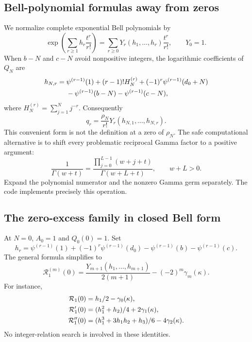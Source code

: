 \documentclass[11pt,letterpaper]{article}
\numberwithin{equation}{section}
\theoremstyle{definition}
\theoremstyle{remark}
\newcommand{\Rcal}{\mathcal R}
\begin{document}
\subsection{Bell-polynomial formulas away from zeros}

We normalize complete exponential Bell polynomials by
\begin{equation}
 \exp\left(\sum_{r\geq1}h_r\frac{t^r}{r!}\right)
       =\sum_{r\geq0}Y_r(h_1,\ldots,h_r)\frac{t^r}{r!},
 \qquad Y_0=1.
 \label{dr:eq:Bell}
\end{equation}
When $b-N$ and $c-N$ avoid nonpositive integers, the logarithmic
coefficients of $Q_N$ are
\begin{align}
 h_{N,r}={}&\psi^{(r-1)}(1)+(r-1)!H_N^{(r)}
 +(-1)^r\psi^{(r-1)}(d_0+N)\notag\\
 &-\psi^{(r-1)}(b-N)-\psi^{(r-1)}(c-N),
 \label{dr:eq:hN}
\end{align}
where $H_N^{(r)}=\sum_{j=1}^N j^{-r}$. Consequently
\begin{equation}
 q_r=\frac{\rho_N}{r!}Y_r(h_{N,1},\ldots,h_{N,r}).
 \label{dr:eq:q-Bell}
\end{equation}
This convenient form is not the definition at a zero of $\rho_N$.
The safe computational alternative is to shift every problematic
reciprocal Gamma factor to a positive argument:
\begin{equation}
 \frac1{\Gamma(w+t)}=
 \frac{\prod_{j=0}^{L-1}(w+j+t)}{\Gamma(w+L+t)},
 \qquad w+L>0.
 \label{dr:eq:rgamma-safe}
\end{equation}
Expand the polynomial numerator and the nonzero Gamma germ separately.
The code implements precisely this operation.

\subsection{The zero-excess family in closed Bell form}

At $N=0$, $A_0=1$ and $Q_0(0)=1$. Set
\begin{equation}
 h_r=\psi^{(r-1)}(1)+(-1)^r\psi^{(r-1)}(d_0)
      -\psi^{(r-1)}(b)-\psi^{(r-1)}(c).
 \label{dr:eq:hzero}
\end{equation}
The general formula simplifies to
\begin{equation}
 \Rcal_1^{(m)}(0)=
 \frac{Y_{m+1}(h_1,\ldots,h_{m+1})}{2(m+1)}
                 -(-2)^m\gamma_m(\kappa).
 \label{dr:eq:zero-jets}
\end{equation}
For instance,
\begin{align}
 \Rcal_1(0)&=h_1/2-\gamma_0(\kappa),\notag\\
 \Rcal_1'(0)&=(h_1^2+h_2)/4+2\gamma_1(\kappa),\notag\\
 \Rcal_1''(0)&=(h_1^3+3h_1h_2+h_3)/6-4\gamma_2(\kappa).
 \label{dr:eq:first-jets}
\end{align}
No integer-relation search is involved in these identities.
\end{document}
